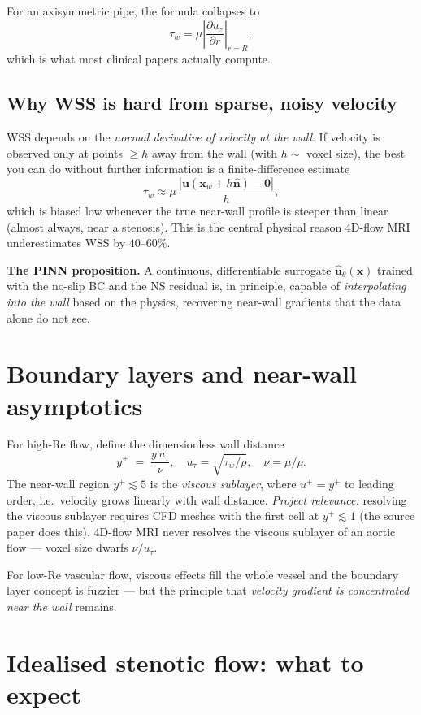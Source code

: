 \documentclass[11pt]{article}
\begin{document}
For an axisymmetric pipe, the formula collapses to
\[
\tau_w = \mu \left|\frac{\partial u_z}{\partial r}\right|_{r=R},
\]
which is what most clinical papers actually compute.

\subsection*{Why WSS is hard from sparse, noisy velocity}
WSS depends on the \emph{normal derivative of velocity at the wall}. If velocity is observed only at points $\geq h$ away from the wall (with $h \sim$ voxel size), the best you can do without further information is a finite-difference estimate
\[
\tau_w \approx \mu \, \frac{|\mathbf{u}(\mathbf{x}_w + h\hat{\mathbf{n}}) - \mathbf{0}|}{h},
\]
which is biased low whenever the true near-wall profile is steeper than linear (almost always, near a stenosis). This is the central physical reason 4D-flow MRI underestimates WSS by $40$--$60\%$.

\textbf{The PINN proposition.} A continuous, differentiable surrogate $\hat{\mathbf{u}}_\theta(\mathbf{x})$ trained with the no-slip BC and the NS residual is, in principle, capable of \emph{interpolating into the wall} based on the physics, recovering near-wall gradients that the data alone do not see.

\section{Boundary layers and near-wall asymptotics}

For high-Re flow, define the dimensionless wall distance
\[
y^+ \;=\; \frac{y\, u_\tau}{\nu}, \quad u_\tau = \sqrt{\tau_w/\rho}, \quad \nu = \mu/\rho.
\]
The near-wall region $y^+ \lesssim 5$ is the \emph{viscous sublayer}, where $u^+ = y^+$ to leading order, i.e.\ velocity grows linearly with wall distance. \textit{Project relevance:} resolving the viscous sublayer requires CFD meshes with the first cell at $y^+ \lesssim 1$ (the source paper does this). 4D-flow MRI never resolves the viscous sublayer of an aortic flow --- voxel size dwarfs $\nu/u_\tau$.

For low-Re vascular flow, viscous effects fill the whole vessel and the boundary layer concept is fuzzier --- but the principle that \emph{velocity gradient is concentrated near the wall} remains.

\section{Idealised stenotic flow: what to expect}
\end{document}
